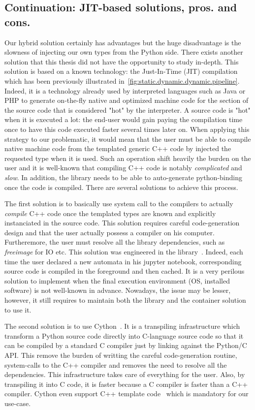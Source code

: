 \subsection{Continuation: JIT-based solutions, pros. and cons.}

Our hybrid solution certainly has advantages but the huge disadvantage is the slowness of injecting our own types from
the Python side. There exists another solution that this thesis did not have the opportunity to study in-depth. This
solution is based on a known technology: the Just-In-Time (JIT) compilation which has been previously illustrated
in~\cref{fig:static.dynamic.dynamic.pipeline}. Indeed, it is a technology already used by interpreted languages such as
Java or PHP to generate on-the-fly native and optimized machine code for the section of the source code that is
considered "hot" by the interpreter. A source code is "hot" when it is executed a lot: the end-user would gain paying
the compilation time once to have this code executed faster several times later on. When applying this strategy to our
problematic, it would mean that the user must be able to compile native machine code from the templated generic C++ code
by injected the requested type when it is used. Such an operation shift heavily the burden on the user and it is
well-known that compiling C++ code is notably \emph{complicated} and \emph{slow}. In addition, the library needs to be
able to auto-generate python-binding once the code is compiled. There are several solutions to achieve this process.

The first solution is to basically use system call to the compilers to actually \emph{compile} C++ code once the
templated types are known and explicitly instanciated in the source code. This solution requires careful code-generation
design and that the user actually possess a compiler on his computer. Furtheremore, the user must resolve all the
library dependencies, such as \emph{freeimage} for IO etc. This solution was engineered in the
library~\parencite{demaille.2013.vcsn}. Indeed, each time the user declared a new automata in his jupyter notebook,
corresponding source code is compiled in the foreground and then cached. It is a very perilous solution to implement
when the final execution environment (OS, installed software) is not well-known in advance. Nowadays, the issue may be
lesser, however, it still requires to maintain both the library and the container solution to use it.

The second solution is to use Cython~\parencite{behnel.2010.cython}. It is a transpiling infrastructure which transform
a Python source code directly into C-language source code so that it can be compiled by a standard C compiler just by
linking against the Python/C API. This remove the burden of writting the careful code-generation routine, system-calls
to the C++ compiler and removes the need to resolve all the dependencies. This infrastructure takes care of everything
for the user. Also, by transpiling it into C code, it is faster because a C compiler is faster than a C++ compiler.
Cython even support C++ template code~\parencite{behnel.2022.cython-template} which is mandatory for our use-case.

